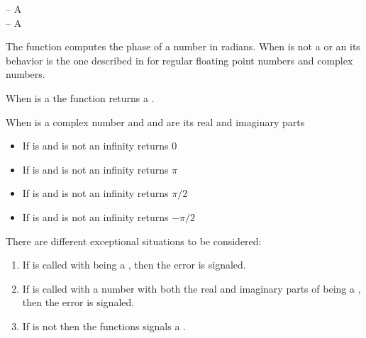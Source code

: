 \documentclass[../Exponentials-Logarithms-Trigonometry.tex]{subfiles}
\begin{document}

\DSyntax{}

  \RArrow {}

\DArgsNValues{}

 -- A \\
 -- A 

\DDescription{}

The function   computes the phase of a 
number in radians. When  is not a  or an
 its behavior is the one described in
\cite{1996:ANSIHyperSpec} for regular floating point numbers and complex
numbers.

\noindent
When  is a  the function  returns a .

When  is a complex number and  and  are its
real and imaginary parts
\begin{itemize}
\item If  is  and  is not an
  infinity  returns $0$
\item If  is  and  is not an
  infinity  returns $\pi$
\item If  is  and  is not an
  infinity  returns $\pi/2$
\item If  is  and  is not an
  infinity  returns $-\pi/2$
\end{itemize}

\DExceptional{}

There are different exceptional situations to be considered:
\begin{enumerate}
\item If  is called with
   being a , then the
   error is signaled.
\item If  is called with a number with both the real and
  imaginary parts of  being a , then the
   error is signaled.
\item If  is not \CL{}
   then the functions  signals a
  .
\end{enumerate}
\end{document}
